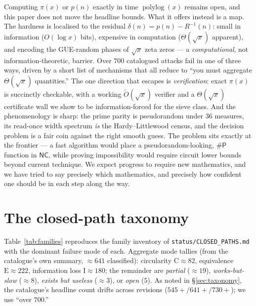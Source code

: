 \documentclass[11pt]{article}
\theoremstyle{plain}
\theoremstyle{definition}
\theoremstyle{remark}
\DeclareMathOperator{\polylog}{polylog}
\newcommand{\Rinv}{R^{-1}}
\newcommand{\Otil}{\widetilde{O}}
\newcommand{\sharpP}{\#\mathsf{P}}
\newcommand{\NC}{\mathsf{NC}}
\begin{document}
Computing $\pi(x)$ or $p(n)$ exactly in time $\polylog(x)$ remains open, and this
paper does not move the headline bounds. What it offers instead is a map. The
hardness is localised to the residual $\delta(n)=p(n)-\Rinv(n)$: small in
information ($O(\log x)$ bits), expensive in computation
($\Theta(\sqrt{x})$ apparent), and encoding the GUE-random phases of $\sqrt{x}$
zeta zeros --- a \emph{computational}, not information-theoretic, barrier. Over
$700$ catalogued attacks fail in one of three ways, driven by a short list of
mechanisms that all reduce to ``you must aggregate $\Theta(\sqrt{x})$ quantities.''
The one direction that escapes is \emph{verification}: exact $\pi(x)$ is succinctly
checkable, with a working $\Otil(\sqrt{x})$ verifier and a $\Theta(\sqrt{x})$
certificate wall we show to be information-forced for the sieve class. And the
phenomenology is sharp: the prime parity is pseudorandom under $36$ measures, its
read-once width spectrum \emph{is} the Hardy--Littlewood census, and the decision
problem is a fair coin against the right smooth guess. The problem sits exactly at
the frontier --- a fast algorithm would place a pseudorandom-looking, $\sharpP$
function in $\NC$, while proving impossibility would require circuit lower bounds
beyond current technique. We expect progress to require new mathematics, and we
have tried to say precisely which mathematics, and precisely how confident one
should be in each step along the way.

\appendix

\section{The closed-path taxonomy}
\label{app:taxonomy}

Table~\ref{tab:families} reproduces the family inventory of
\texttt{status/CLOSED\_PATHS.md} with the dominant failure mode of each.
Aggregate mode tallies (from the catalogue's own summary, ${\approx}641$
classified): circularity $\mathrm{C}\approx82$, equivalence
$\mathrm{E}\approx222$, information loss $\mathrm{I}\approx180$; the remainder are
\emph{partial} (${\approx}19$), \emph{works-but-slow} (${\approx}8$), \emph{exists
but useless} (${\approx}3$), or \emph{open} ($5$). As noted in
\S\ref{sec:taxonomy}, the catalogue's headline count drifts across revisions
($545{+}/641{+}/730{+}$); we use ``over $700$.''
\end{document}
